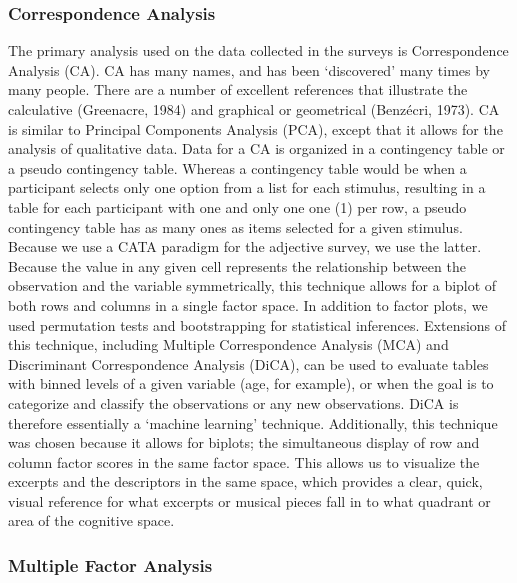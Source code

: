 \documentclass[
  english,
  man,floatsintext]{apa6}
\begin{document}
\hypertarget{correspondence-analysis}{%
\subsubsection{Correspondence Analysis}\label{correspondence-analysis}}

The primary analysis used on the data collected in the surveys is Correspondence Analysis (CA). CA has many names, and has been `discovered' many times by many people. There are a number of excellent references that illustrate the calculative (Greenacre, 1984) and graphical or geometrical (Benzécri, 1973). CA is similar to Principal Components Analysis (PCA), except that it allows for the analysis of qualitative data. Data for a CA is organized in a contingency table or a pseudo contingency table. Whereas a contingency table would be when a participant selects only one option from a list for each stimulus, resulting in a table for each participant with one and only one one (1) per row, a pseudo contingency table has as many ones as items selected for a given stimulus. Because we use a CATA paradigm for the adjective survey, we use the latter. Because the value in any given cell represents the relationship between the observation and the variable symmetrically, this technique allows for a biplot of both rows and columns in a single factor space. In addition to factor plots, we used permutation tests and bootstrapping for statistical inferences. Extensions of this technique, including Multiple Correspondence Analysis (MCA) and Discriminant Correspondence Analysis (DiCA), can be used to evaluate tables with binned levels of a given variable (age, for example), or when the goal is to categorize and classify the observations or any new observations. DiCA is therefore essentially a `machine learning' technique.
Additionally, this technique was chosen because it allows for biplots; the simultaneous display of row and column factor scores in the same factor space. This allows us to visualize the excerpts and the descriptors in the same space, which provides a clear, quick, visual reference for what excerpts or musical pieces fall in to what quadrant or area of the cognitive space.

\hypertarget{multiple-factor-analysis}{%
\subsubsection{Multiple Factor Analysis}\label{multiple-factor-analysis}}
\end{document}
